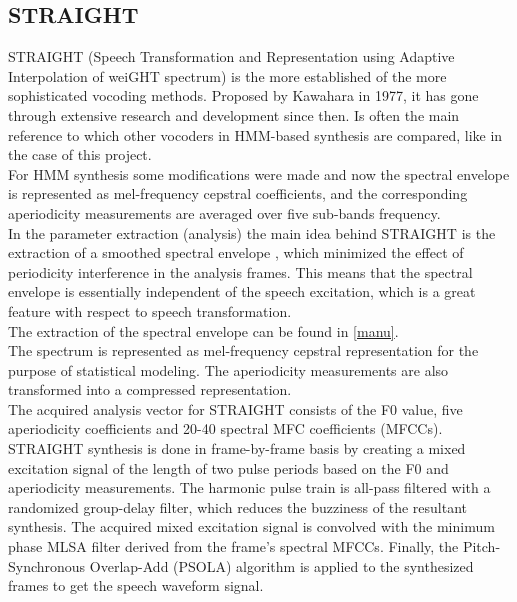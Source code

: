 \subsection{STRAIGHT}\label{straightvoco}
STRAIGHT (Speech Transformation and Representation using Adaptive Interpolation of weiGHT spectrum) is the more established of the more sophisticated vocoding methods. Proposed by Kawahara in 1977, it has gone through extensive research and development since then. Is often the main reference to which other vocoders in HMM-based synthesis are compared, like in the case of this project.\\
For HMM synthesis some modifications were made and now the spectral envelope is represented as mel-frequency cepstral coefficients, and the corresponding aperiodicity measurements are averaged over five sub-bands frequency.\\
In the parameter extraction (analysis) the main idea behind STRAIGHT is the extraction of a smoothed spectral envelope , which minimized the effect of periodicity interference in the analysis frames. This means that the spectral envelope is essentially independent of the speech excitation, which is a great feature with respect to speech transformation.\\
The extraction of the spectral envelope can be found in \ref{manu}.\\
The spectrum is represented as mel-frequency cepstral representation for the purpose of statistical modeling. The aperiodicity measurements are also transformed into a compressed representation. \\
The acquired analysis vector for STRAIGHT consists of the F0 value, five aperiodicity coefficients and 20-40 spectral MFC coefficients (MFCCs). \\
STRAIGHT synthesis is done in frame-by-frame basis by creating a mixed excitation signal of the length of two pulse periods based on the F0 and aperiodicity measurements. The harmonic pulse train is all-pass filtered with a randomized group-delay filter, which reduces the buzziness of the resultant synthesis. The acquired mixed excitation signal is convolved with the minimum phase MLSA filter derived from the frame's spectral MFCCs. Finally, the Pitch-Synchronous Overlap-Add (PSOLA) algorithm is applied to the synthesized frames to get the speech waveform signal.  
